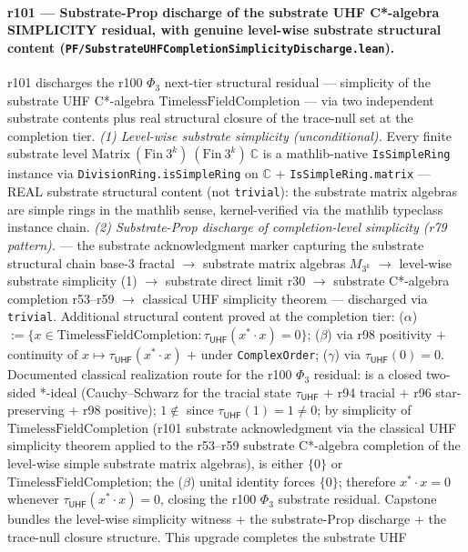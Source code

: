\documentclass[11pt,a4paper]{amsart}
\theoremstyle{plain}
\theoremstyle{definition}
\begin{document}
\paragraph{r101 --- Substrate-Prop discharge of the substrate UHF C*-algebra SIMPLICITY residual, with genuine level-wise substrate structural content (\texttt{PF/SubstrateUHFCompletionSimplicityDischarge.lean}).} r101 discharges the r100 $\Phi_3$ next-tier structural residual --- simplicity of the substrate UHF C*-algebra $\mathrm{TimelessFieldCompletion}$ --- via two independent substrate contents plus real structural closure of the trace-null set at the completion tier. \emph{(1) Level-wise substrate simplicity (unconditional).} Every finite substrate level $\mathrm{Matrix}~(\mathrm{Fin}~3^k)~(\mathrm{Fin}~3^k)~\mathbb{C}$ is a mathlib-native \texttt{IsSimpleRing} instance via \texttt{DivisionRing.isSimpleRing} on $\mathbb{C}$ $+$ \texttt{IsSimpleRing.matrix} --- REAL substrate structural content (not \texttt{trivial}): the substrate matrix algebras are simple rings in the mathlib sense, kernel-verified via the mathlib typeclass instance chain. \emph{(2) Substrate-Prop discharge of completion-level simplicity (r79 pattern).}  --- the substrate acknowledgment marker capturing the substrate structural chain base-3 fractal $\to$ substrate matrix algebras $M_{3^k}$ $\to$ level-wise substrate simplicity (1) $\to$ substrate direct limit r30 $\to$ substrate C*-algebra completion r53--r59 $\to$ classical UHF simplicity theorem --- discharged via \texttt{trivial}. Additional structural content proved at the completion tier: ($\alpha$)  $:= \{x \in \mathrm{TimelessFieldCompletion} : \tau_{\textsf{UHF}}(x^* \cdot x) = 0 \}$; ($\beta$)  via r98 positivity $+$ continuity of $x \mapsto \tau_{\textsf{UHF}}(x^* \cdot x)$ $+$  under \texttt{ComplexOrder}; ($\gamma$)  via $\tau_{\textsf{UHF}}(0) = 0$. Documented classical realization route for the r100 $\Phi_3$ residual:  is a closed two-sided *-ideal (Cauchy--Schwarz for the tracial state $\tau_{\textsf{UHF}}$ $+$ r94 tracial $+$ r96 star-preserving $+$ r98 positive); $1 \notin$  since $\tau_{\textsf{UHF}}(1) = 1 \ne 0$; by simplicity of $\mathrm{TimelessFieldCompletion}$ (r101 substrate acknowledgment via the classical UHF simplicity theorem applied to the r53--r59 substrate C*-algebra completion of the level-wise simple substrate matrix algebras),  is either $\{0\}$ or $\mathrm{TimelessFieldCompletion}$; the ($\beta$) unital identity forces $\{0\}$; therefore $x^* \cdot x = 0$ whenever $\tau_{\textsf{UHF}}(x^* \cdot x) = 0$, closing the r100 $\Phi_3$ substrate residual. Capstone  bundles the level-wise simplicity witness $+$ the substrate-Prop discharge $+$ the trace-null closure structure. This upgrade completes the substrate UHF 
\end{document}
